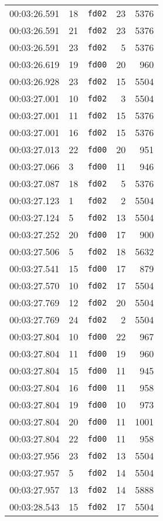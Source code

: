 \documentclass{article}
\begin{document}
\begin{longtable}{lllrr}
00:03:26.591 & 18 & \texttt{fd02} & 23 & 5376 \\
00:03:26.591 & 21 & \texttt{fd02} & 23 & 5376 \\
00:03:26.591 & 23 & \texttt{fd02} & 5 & 5376 \\
00:03:26.619 & 19 & \texttt{fd00} & 20 & 960 \\
00:03:26.928 & 23 & \texttt{fd02} & 15 & 5504 \\
00:03:27.001 & 10 & \texttt{fd02} & 3 & 5504 \\
00:03:27.001 & 11 & \texttt{fd02} & 15 & 5376 \\
00:03:27.001 & 16 & \texttt{fd02} & 15 & 5376 \\
00:03:27.013 & 22 & \texttt{fd00} & 20 & 951 \\
00:03:27.066 & 3 & \texttt{fd00} & 11 & 946 \\
00:03:27.087 & 18 & \texttt{fd02} & 5 & 5376 \\
00:03:27.123 & 1 & \texttt{fd02} & 2 & 5504 \\
00:03:27.124 & 5 & \texttt{fd02} & 13 & 5504 \\
00:03:27.252 & 20 & \texttt{fd00} & 17 & 900 \\
00:03:27.506 & 5 & \texttt{fd02} & 18 & 5632 \\
00:03:27.541 & 15 & \texttt{fd00} & 17 & 879 \\
00:03:27.570 & 10 & \texttt{fd02} & 17 & 5504 \\
00:03:27.769 & 12 & \texttt{fd02} & 20 & 5504 \\
00:03:27.769 & 24 & \texttt{fd02} & 2 & 5504 \\
00:03:27.804 & 10 & \texttt{fd00} & 22 & 967 \\
00:03:27.804 & 11 & \texttt{fd00} & 19 & 960 \\
00:03:27.804 & 15 & \texttt{fd00} & 11 & 945 \\
00:03:27.804 & 16 & \texttt{fd00} & 11 & 958 \\
00:03:27.804 & 19 & \texttt{fd00} & 10 & 973 \\
00:03:27.804 & 20 & \texttt{fd00} & 11 & 1001 \\
00:03:27.804 & 22 & \texttt{fd00} & 11 & 958 \\
00:03:27.956 & 23 & \texttt{fd02} & 13 & 5504 \\
00:03:27.957 & 5 & \texttt{fd02} & 14 & 5504 \\
00:03:27.957 & 13 & \texttt{fd02} & 14 & 5888 \\
00:03:28.543 & 15 & \texttt{fd02} & 17 & 5504 \\

\end{longtable}
\end{document}
